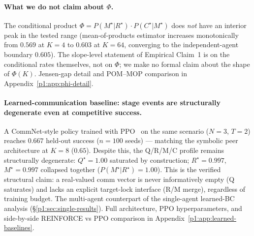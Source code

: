 \documentclass{article}
\begin{document}
\paragraph{What we do not claim about $\Phi$.} The conditional product $\Phi = P(M^\star|R^\star)\!\cdot\!P(C^\star|M^\star)$ does \emph{not} have an interior peak in the tested range (mean-of-products estimator increases monotonically from $0.569$ at $K{=}4$ to $0.603$ at $K{=}64$, converging to the independent-agent boundary $0.605$). The slope-level statement of Empirical Claim~1 is on the conditional rates themselves, not on $\Phi$; we make no formal claim about the shape of $\Phi(K)$. Jensen-gap detail and POM--MOP comparison in Appendix~\ref{p1:app:phi-detail}.

\paragraph{Learned-communication baseline: stage events are structurally degenerate even at competitive success.}
A CommNet-style policy \citep{sukhbaatar2016commnet} trained with PPO~\citep{schulman2017proximal} on the same scenario ($N{=}3$, $T{=}2$) reaches $0.667$ held-out success ($n{=}100$ seeds) --- matching the symbolic peer architecture at $K{=}8$ ($0.65$). Despite this, the Q/R/M/C profile remains structurally degenerate: $Q^\star{=}1.00$ saturated by construction; $R^\star{=}0.997$, $M^\star{=}0.997$ collapsed together ($P(M^\star|R^\star){=}1.00$). This is the verified structural claim: a real-valued comm vector is never informatively empty (Q saturates) and lacks an explicit target-lock interface (R/M merge), regardless of training budget. The multi-agent counterpart of the single-agent learned-BC analysis (\S\ref{p1:sec:single-results}). Full architecture, PPO hyperparameters, and side-by-side REINFORCE vs PPO comparison in Appendix~\ref{p1:app:learned-baselines}.
\end{document}
